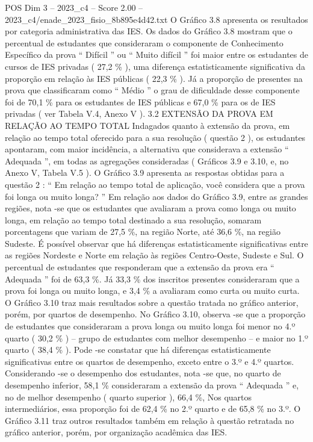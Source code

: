 \begin{textsample}{POS Dim 3 – 2023\_c4 – Score 2.00 – 2023\_c4/enade\_2023\_fisio\_8b895e4d42.txt}
O Gráfico 3.8 apresenta os resultados por categoria administrativa das IES.
Os dados do Gráfico 3.8 mostram que o percentual de estudantes que consideraram o componente de Conhecimento Específico da prova “ Difícil ” ou “ Muito difícil ” foi maior entre os estudantes de cursos de IES privadas ( 27,2 \% ), uma diferença estatisticamente significativa da proporção em relação às IES públicas ( 22,3 \% ).
Já a proporção de presentes na prova que classificaram como “ Médio ” o grau de dificuldade desse componente foi de 70,1 \% para os estudantes de IES públicas e 67,0 \% para os de IES privadas ( ver Tabela V.4, Anexo V ). 3.2 EXTENSÃO DA PROVA EM RELAÇÃO AO TEMPO TOTAL Indagados quanto à extensão da prova, em relação ao tempo total oferecido para a sua resolução ( questão 2 ), os estudantes apontaram, com maior incidência, a alternativa que considerava a extensão “ Adequada ”, em todas as agregações consideradas ( Gráficos 3.9 e 3.10, e, no Anexo V, Tabela V.5 ).
O Gráfico 3.9 apresenta as respostas obtidas para a questão 2 : “ Em relação ao tempo total de aplicação, você considera que a prova foi longa ou muito longa? ” Em relação aos dados do Gráfico 3.9, entre as grandes regiões, nota -se que os estudantes que avaliaram a prova como longa ou muito longa, em relação ao tempo total destinado a sua resolução, somaram porcentagens que variam de 27,5 \%, na região Norte, até 36,6 \%, na região Sudeste.
É possível observar que há diferenças estatisticamente significativas entre as regiões Nordeste e Norte em relação às regiões Centro-Oeste, Sudeste e Sul.
O percentual de estudantes que responderam que a extensão da prova era “ Adequada ” foi de 63,3 \%.
Já 33,3 \% dos inscritos presentes consideraram que a prova foi longa ou muito longa, e 3,4 \% a avaliaram como curta ou muito curta.
O Gráfico 3.10 traz mais resultados sobre a questão tratada no gráfico anterior, porém, por quartos de desempenho.
No Gráfico 3.10, observa -se que a proporção de estudantes que consideraram a prova longa ou muito longa foi menor no 4.º quarto ( 30,2 \% ) – grupo de estudantes com melhor desempenho – e maior no 1.º quarto ( 38,4 \% ).
Pode -se constatar que há diferenças estatisticamente significativas entre os quartos de desempenho, exceto entre o 3.º e 4.º quartos.
Considerando -se o desempenho dos estudantes, nota -se que, no quarto de desempenho inferior, 58,1 \% consideraram a extensão da prova “ Adequada ” e, no de melhor desempenho ( quarto superior ), 66,4 \%, Nos quartos intermediários, essa proporção foi de 62,4 \% no 2.º quarto e de 65,8 \% no 3.º.
O Gráfico 3.11 traz outros resultados também em relação à questão retratada no gráfico anterior, porém, por organização acadêmica das IES.

\end{textsample}
